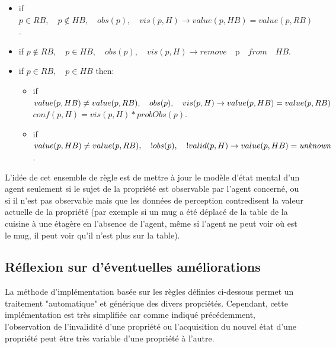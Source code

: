 \documentclass[a4paper,11pt,twoside]{StyleThese}
\begin{document}
\begin{itemize}
\item if $p \in RB, \quad p\not\in HB,\quad obs(p),\quad vis(p,H) \rightarrow value(p,HB)=value(p,RB)$.
\item if $p \not \in RB,\quad p\in HB,\quad obs(p),\quad vis(p,H) \rightarrow remove\quad $p$ \quad from \quad HB$.
\item if $p\in RB,\quad p\in HB$ then:
	\begin{itemize}
      \item if $value(p,HB)\neq value(p,RB),\\ \quad obs(p),\quad vis(p,H) \rightarrow  value(p,HB)=value(p,RB)$ \\
      $conf(p,H)=vis(p,H)*probObs(p)$.
      \item if $value(p,HB)\neq value(p,RB),\\ \quad !obs(p),\quad !valid(p,H) \rightarrow  value(p,HB)=\textit{unknown}$.
	\end{itemize}
\end{itemize}

L'idée de cet ensemble de règle est de mettre à jour le modèle d'état mental d'un agent seulement si le sujet de la propriété est observable par l'agent concerné, ou si il n'est pas observable mais que les données de perception contredisent la valeur actuelle de la propriété (par exemple si un mug a été déplacé de la table de la cuisine à une étagère en l'absence de l'agent, même si l'agent ne peut voir où est le mug, il peut voir qu'il n'est plus sur la table).


\subsection{Réflexion sur d'éventuelles améliorations}
La méthode d'implémentation basée sur les règles définies ci-dessous permet un traitement "automatique" et générique des divers propriétés.
Cependant, cette implémentation est très simplifiée car comme indiqué précédemment, 
l'observation de l'invalidité d'une propriété ou l'acquisition du nouvel état d'une propriété peut être très variable d'une propriété à l'autre.
\end{document}
